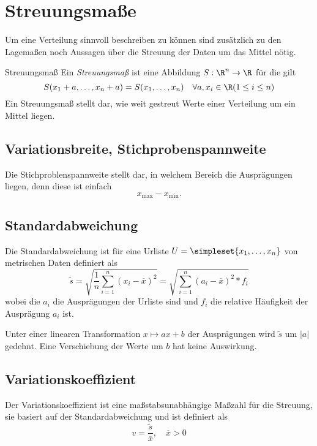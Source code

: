 \section{Streuungsmaße}
Um eine Verteilung sinnvoll beschreiben zu können sind zusätzlich zu den Lagemaßen noch Aussagen über die Streuung der Daten um das Mittel nötig.

\begin{definition}{Streuungsmaß}
	Ein \emph{Streuungsmaß} ist eine Abbildung $S:\R^n\rightarrow \R$ für die gilt
	\begin{equation*}
		S(x_1+a,\ldots,x_n+a)=S(x_1,\ldots,x_n) \quad\forall a,x_i\in\R (1\leq i\leq n)
	\end{equation*}
	Ein Streuungsmaß stellt dar, wie weit gestreut Werte einer Verteilung um ein Mittel liegen.
\end{definition}

\subsection{Variationsbreite, Stichprobenspannweite}
Die Stichproblenspannweite stellt dar, in welchem Bereich die Ausprägungen liegen, denn diese ist einfach
\begin{equation*}
	x_{\operatorname{max}}-x_{\operatorname{min}}.
\end{equation*}

\subsection{Standardabweichung}
Die Standardabweichung ist für eine Urliste $U=\simpleset{x_1,\ldots,x_n}$ von metrischen Daten definiert als
\begin{equation*}
	\tilde s=\sqrt{\frac 1n\sum_{i=1}^n (x_i-\overline x)^2}=\sqrt{\sum_{i=1}^n (a_i-\overline x)^2*f_i}
\end{equation*}
wobei die $a_i$ die Ausprägungen der Urliste sind und $f_i$ die relative Häufigkeit der Ausprägung $a_i$ ist.

Unter einer linearen Transformation $x\mapsto ax+b$ der Ausprägungen wird $\tilde s$ um $|a|$ gedehnt. Eine Verschiebung der Werte um $b$ hat keine Auswirkung.

\subsection{Variationskoeffizient}
Der Variationskoeffizient ist eine maßstabsunabhängige Maßzahl für die Streuung, sie basiert auf der Standardabweichung und ist definiert als
\begin{equation*}
	v=\frac{\tilde s}{\overline x},\quad \overline x>0
\end{equation*}

